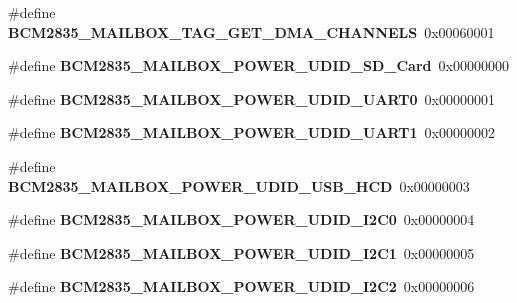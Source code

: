 \begin{DoxyCompactItemize}
\item 
\mbox{\label{group__raspberrypi__vc_gaac692552b8a328d079fbcb090f9a1d94}} 
\#define {\bfseries B\+C\+M2835\+\_\+\+M\+A\+I\+L\+B\+O\+X\+\_\+\+T\+A\+G\+\_\+\+G\+E\+T\+\_\+\+D\+M\+A\+\_\+\+C\+H\+A\+N\+N\+E\+LS}~0x00060001
\item 
\mbox{\label{group__raspberrypi__vc_gafa175dcb08dc9cba618e62e7d2cb356a}} 
\#define {\bfseries B\+C\+M2835\+\_\+\+M\+A\+I\+L\+B\+O\+X\+\_\+\+P\+O\+W\+E\+R\+\_\+\+U\+D\+I\+D\+\_\+\+S\+D\+\_\+\+Card}~0x00000000
\item 
\mbox{\label{group__raspberrypi__vc_ga83948d8a94fcee9d35572946175feb03}} 
\#define {\bfseries B\+C\+M2835\+\_\+\+M\+A\+I\+L\+B\+O\+X\+\_\+\+P\+O\+W\+E\+R\+\_\+\+U\+D\+I\+D\+\_\+\+U\+A\+R\+T0}~0x00000001
\item 
\mbox{\label{group__raspberrypi__vc_ga3e3a804d4a4366fba0f5688ce6b7cb57}} 
\#define {\bfseries B\+C\+M2835\+\_\+\+M\+A\+I\+L\+B\+O\+X\+\_\+\+P\+O\+W\+E\+R\+\_\+\+U\+D\+I\+D\+\_\+\+U\+A\+R\+T1}~0x00000002
\item 
\mbox{\label{group__raspberrypi__vc_ga2a4451bea7652e1e051c6ea824bfbca9}} 
\#define {\bfseries B\+C\+M2835\+\_\+\+M\+A\+I\+L\+B\+O\+X\+\_\+\+P\+O\+W\+E\+R\+\_\+\+U\+D\+I\+D\+\_\+\+U\+S\+B\+\_\+\+H\+CD}~0x00000003
\item 
\mbox{\label{group__raspberrypi__vc_gaa14e615dbaf958f06160256cb99f1bc7}} 
\#define {\bfseries B\+C\+M2835\+\_\+\+M\+A\+I\+L\+B\+O\+X\+\_\+\+P\+O\+W\+E\+R\+\_\+\+U\+D\+I\+D\+\_\+\+I2\+C0}~0x00000004
\item 
\mbox{\label{group__raspberrypi__vc_gaebed9d4224e3d8890c65b2b7c12b04d6}} 
\#define {\bfseries B\+C\+M2835\+\_\+\+M\+A\+I\+L\+B\+O\+X\+\_\+\+P\+O\+W\+E\+R\+\_\+\+U\+D\+I\+D\+\_\+\+I2\+C1}~0x00000005
\item 
\mbox{\label{group__raspberrypi__vc_ga3bb55ce5d9c11984160b7d5e7561267f}} 
\#define {\bfseries B\+C\+M2835\+\_\+\+M\+A\+I\+L\+B\+O\+X\+\_\+\+P\+O\+W\+E\+R\+\_\+\+U\+D\+I\+D\+\_\+\+I2\+C2}~0x00000006
\item 

\end{DoxyCompactItemize}
